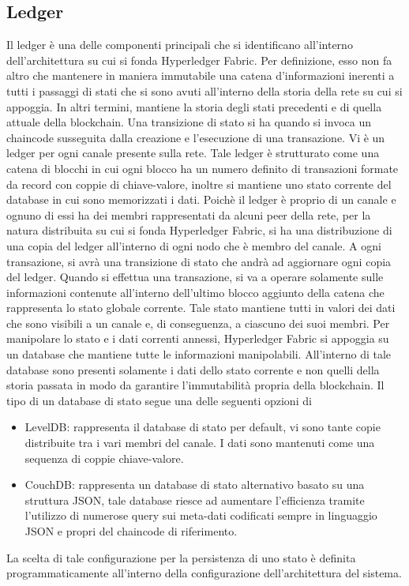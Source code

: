 \subsection{Ledger}
Il ledger è una delle componenti principali che si identificano all'interno 
\newline dell'architettura su cui si fonda Hyperledger Fabric. Per definizione, esso non fa altro che mantenere in maniera immutabile una catena d'informazioni inerenti a tutti i passaggi di stati che si sono avuti all'interno della storia della rete su cui si appoggia. In altri termini, mantiene la storia degli stati precedenti e di quella attuale della blockchain. Una transizione di stato si ha quando si invoca un chaincode susseguita dalla creazione e l'esecuzione di una transazione. Vi è un ledger per ogni canale presente sulla rete. Tale ledger è strutturato come una catena di blocchi in cui ogni blocco ha un numero definito di transazioni formate da record con coppie di chiave-valore, inoltre si mantiene uno stato corrente del database in cui sono memorizzati i dati. Poichè il ledger è proprio di un canale e ognuno di essi ha dei membri rappresentati da alcuni peer della rete, per la natura distribuita su cui si fonda Hyperledger Fabric, si ha una distribuzione di una copia del ledger all'interno di ogni nodo che è membro del canale. A ogni transazione, si avrà una transizione di stato che andrà ad aggiornare ogni copia del ledger. Quando si effettua una transazione, si va a operare solamente sulle informazioni contenute all'interno dell'ultimo blocco aggiunto della catena che rappresenta lo stato globale corrente. Tale stato mantiene tutti in valori dei dati che sono visibili a un canale e, di conseguenza, a ciascuno dei suoi membri. Per manipolare lo stato e i dati correnti annessi, Hyperledger Fabric si appoggia su un database che mantiene tutte le informazioni manipolabili. All'interno di tale database sono presenti solamente i dati dello stato corrente e non quelli della storia passata in modo da garantire l'immutabilità propria della blockchain. Il tipo di un database di stato segue una delle seguenti opzioni di 
\newline
\begin{itemize}
    \item LevelDB: rappresenta il database di stato per default, vi sono tante copie distribuite tra i vari membri del canale. I dati sono mantenuti come una sequenza di coppie chiave-valore.
    \item CouchDB: rappresenta un database di stato alternativo basato su una struttura JSON, tale database riesce ad aumentare l'efficienza tramite l'utilizzo di numerose query sui meta-dati codificati sempre in linguaggio JSON e propri del chaincode di riferimento.
\end{itemize}
La scelta di tale configurazione per la persistenza di uno stato è definita programmaticamente all'interno della configurazione dell'architettura del sistema.
